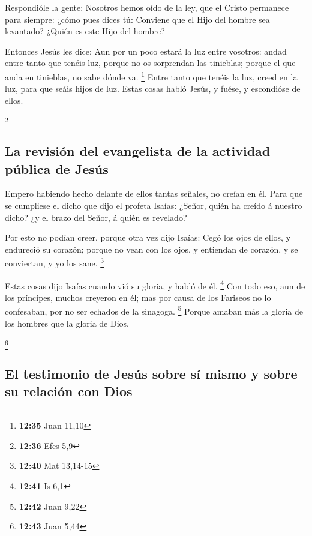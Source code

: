  Respondióle la gente: Nosotros hemos oído de la ley, que
el Cristo permanece para siempre: ¿cómo pues dices tú: Conviene que el
Hijo del hombre sea levantado? ¿Quién es este Hijo del hombre?

 Entonces Jesús les dice: Aun por un poco estará la luz
entre vosotros: andad entre tanto que tenéis luz, porque no os
sorprendan las tinieblas; porque el que anda en tinieblas, no sabe dónde
va. \footnote{\textbf{12:35} Juan 11,10}  Entre tanto que
tenéis la luz, creed en la luz, para que seáis hijos de luz. Estas cosas
habló Jesús, y fuése, y escondióse de ellos.

\footnote{\textbf{12:36} Efes 5,9}

\hypertarget{la-revisiuxf3n-del-evangelista-de-la-actividad-puxfablica-de-jesuxfas}{%
\subsection{La revisión del evangelista de la actividad pública de
Jesús}\label{la-revisiuxf3n-del-evangelista-de-la-actividad-puxfablica-de-jesuxfas}}

 Empero habiendo hecho delante de ellos tantas señales,
no creían en él.  Para que se cumpliese el dicho que dijo
el profeta Isaías: ¿Señor, quién ha creído á nuestro dicho? ¿y el brazo
del Señor, á quién es revelado?

 Por esto no podían creer, porque otra vez dijo Isaías:
 Cegó los ojos de ellos, y endureció su corazón; porque
no vean con los ojos, y entiendan de corazón, y se conviertan, y yo los
sane. \footnote{\textbf{12:40} Mat 13,14-15}

 Estas cosas dijo Isaías cuando vió su gloria, y habló de
él. \footnote{\textbf{12:41} Is 6,1}  Con todo eso, aun
de los príncipes, muchos creyeron en él; mas por causa de los Fariseos
no lo confesaban, por no ser echados de la sinagoga. \footnote{\textbf{12:42}
  Juan 9,22}  Porque amaban más la gloria de los hombres
que la gloria de Dios.

\footnote{\textbf{12:43} Juan 5,44}

\hypertarget{el-testimonio-de-jesuxfas-sobre-suxed-mismo-y-sobre-su-relaciuxf3n-con-dios}{%
\subsection{El testimonio de Jesús sobre sí mismo y sobre su relación
con
Dios}\label{el-testimonio-de-jesuxfas-sobre-suxed-mismo-y-sobre-su-relaciuxf3n-con-dios}}


